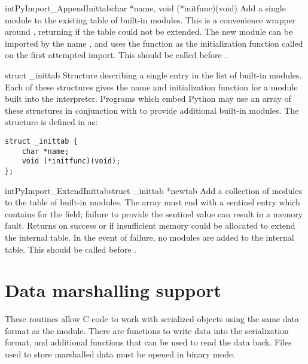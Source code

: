 \begin{cfuncdesc}{int}{PyImport_AppendInittab}{char *name,
                                               void (*initfunc)(void)}
  Add a single module to the existing table of built-in modules.  This
  is a convenience wrapper around
  , returning  if the
  table could not be extended.  The new module can be imported by the
  name , and uses the function  as the
  initialization function called on the first attempted import.  This
  should be called before .
\end{cfuncdesc}

\begin{ctypedesc}[_inittab]{struct _inittab}
  Structure describing a single entry in the list of built-in
  modules.  Each of these structures gives the name and initialization
  function for a module built into the interpreter.  Programs which
  embed Python may use an array of these structures in conjunction
  with  to provide additional
  built-in modules.  The structure is defined in
   as:

\begin{verbatim}
struct _inittab {
    char *name;
    void (*initfunc)(void);
};
\end{verbatim}
\end{ctypedesc}

\begin{cfuncdesc}{int}{PyImport_ExtendInittab}{struct _inittab *newtab}
  Add a collection of modules to the table of built-in modules.  The
   array must end with a sentinel entry which contains
  \NULL{} for the  field; failure to provide the sentinel
  value can result in a memory fault.  Returns  on success or
   if insufficient memory could be allocated to extend the
  internal table.  In the event of failure, no modules are added to
  the internal table.  This should be called before
  .
\end{cfuncdesc}


\section{Data marshalling support \label{marshalling-utils}}

These routines allow C code to work with serialized objects using the
same data format as the  module.  There are functions
to write data into the serialization format, and additional functions
that can be used to read the data back.  Files used to store marshalled
data must be opened in binary mode.

